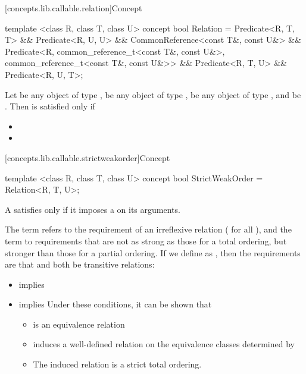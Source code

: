 [concepts.lib.callable.relation]{Concept }

%
\begin{itemdecl}
template <class R, class T, class U>
concept bool Relation =
  Predicate<R, T, T> &&
  Predicate<R, U, U> &&
  CommonReference<const T&, const U&> &&
  Predicate<R,
    common_reference_t<const T&, const U&>,
    common_reference_t<const T&, const U&>> &&
  Predicate<R, T, U> &&
  Predicate<R, U, T>;
\end{itemdecl}

\begin{itemdescr}
\pnum
Let  be any object of type ,  be any
object of type ,  be any
object of type , and  be
.
Then  is satisfied only if

\begin{itemize}
\item {}
\item {}
\end{itemize}
\end{itemdescr}

[concepts.lib.callable.strictweakorder]{Concept }

%
\begin{itemdecl}
template <class R, class T, class U>
concept bool StrictWeakOrder = Relation<R, T, U>;
\end{itemdecl}

\begin{itemdescr}
\pnum
A  satisfies  only if
it imposes a  on its arguments.

\pnum
The term
refers to the
requirement of an irreflexive relation ( for all ),
and the term
to requirements that are not as strong as
those for a total ordering,
but stronger than those for a partial
ordering.
If we define
as
,
then the requirements are that
and
both be transitive  relations:

\begin{itemize}
\item
{}
implies
\item
{}
implies
\enternote
Under these conditions, it can be shown that
\begin{itemize}
\item
{}
is an equivalence relation
\item
{}
induces a well-defined relation on the equivalence
classes determined by
\item
The induced relation is a strict total ordering.
\exitnote
\end{itemize}
\end{itemize}
\end{itemdescr}
